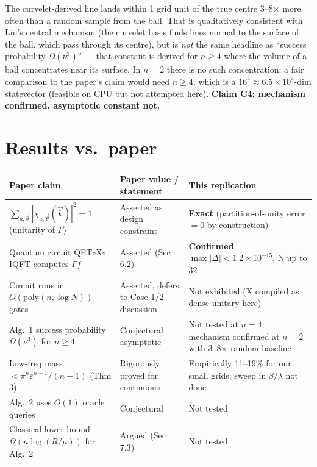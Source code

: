 \documentclass[11pt]{article}
\begin{document}
The curvelet-derived line lands within 1 grid unit of the true centre 3--8$\times$ more often than a random sample from the ball. That is qualitatively consistent with Liu's central mechanism (the curvelet basis finds lines normal to the surface of the ball, which pass through its centre), but is \emph{not} the same headline as ``success probability $\Omega(\nu^3)$'' --- that constant is derived for $n \geq 4$ where the volume of a ball concentrates near its surface. In $n=2$ there is no such concentration; a fair comparison to the paper's claim would need $n \geq 4$, which is a $16^4 \approx 6.5 \times 10^4$-dim statevector (feasible on CPU but not attempted here). \textbf{Claim C4: mechanism confirmed, asymptotic constant not.}

\section{Results vs.\ paper}

\begin{center}
\begin{tabular}{p{6cm}p{4cm}p{5cm}}
\toprule
Paper claim & Paper value / statement & This replication \\
\midrule
$\sum_{a,\vec\theta} |\chi_{a,\vec\theta}(\vec k)|^2 = 1$ (unitarity of $\Gamma$) & Asserted as design constraint & \textbf{Exact} (partition-of-unity error $= 0$ by construction) \\
Quantum circuit QFT$\circ$X$\circ$IQFT computes $\Gamma f$ & Asserted (Sec 6.2) & \textbf{Confirmed} $\max|\Delta| < 1.2\times 10^{-15}$, N up to 32 \\
Circuit runs in $O(\text{poly}(n, \log N))$ gates & Asserted, defers to Case-1/2 discussion & Not exhibited (X compiled as dense unitary here) \\
Alg.\ 1 success probability $\Omega(\nu^3)$ for $n \geq 4$ & Conjectural asymptotic & Not tested at $n=4$; mechanism confirmed at $n=2$ with 3--8$\times$ random baseline \\
Low-freq mass $< \pi^n \varepsilon^{n-1}/(n-1)$ (Thm 3) & Rigorously proved for continuous & Empirically 11--19\% for our small grids; sweep in $\beta/\lambda$ not done \\
Alg.\ 2 uses $O(1)$ oracle queries & Conjectural & Not tested \\
Classical lower bound $\tilde\Omega(n \log(R/\mu))$ for Alg.\ 2 & Argued (Sec 7.3) & Not tested \\
\bottomrule
\end{tabular}
\end{center}
\end{document}
